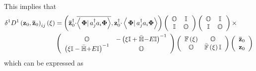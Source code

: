 \documentclass[aps,preprint]{revtex4}%
\begin{document}
This implies that
\begin{align}
\delta^{1}D^{1}\left(  \mathbf{z}{_{0},\mathbf{\bar{z}}_{0}}\right)
_{ij}\left(  \xi\right)   &  =\left(  {\mathbf{\bar{z}}_{0}^{\dagger}\cdot
}\overline{\left\langle \left.  \mathbf{\Phi}\right\vert a_{j}^{\dag}%
a_{i}\mathbf{\Phi}\right\rangle },{\mathbf{z}_{0}^{\dagger}\cdot}\left\langle
\left.  \mathbf{\Phi}\right\vert a_{j}^{\dag}a_{i}\mathbf{\Phi}\right\rangle
\right)  \left(
\begin{array}
[c]{cc}%
\mathbb{O} & \mathbb{I}\\
\mathbb{I} & \mathbb{O}%
\end{array}
\right)  \left(
\begin{array}
[c]{cc}%
\mathbb{O} & \mathbb{I}\\
\mathbb{I} & \mathbb{O}%
\end{array}
\right)  \times\nonumber\\
&  \left(
\begin{array}
[c]{cc}%
\mathbb{O} & -\left(  \xi\mathbb{I+\bar{H}}\mathbf{-}E\mathbb{I}\right)
^{-1}\\
\left(  \xi\mathbb{I-\bar{H}}\mathbf{+}E\mathbb{I}\right)  ^{-1} & \mathbb{O}%
\end{array}
\right)  \left(
\begin{array}
[c]{cc}%
\mathbb{F}\left(  \xi\right)  & \mathbb{O}\\
\mathbb{O} & \mathbb{\bar{F}}\left(  \xi\right)  \mathbb{I}%
\end{array}
\right)  \left(
\begin{array}
[c]{c}%
\mathbf{\bar{z}}_{0}\\
\mathbf{z}_{0}%
\end{array}
\right)
\end{align}
which can be expressed as
\end{document}
